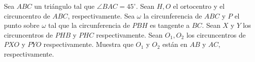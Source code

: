 Sea $ABC$ un triángulo tal que $\angle BAC = 45^{\circ}$. Sean $H,O$ el ortocentro y el circuncentro de $ABC$, respectivamente. Sea $\omega$ la circunferencia de $ABC$ y $P$ el punto sobre $\omega$ tal que la circunferencia de $PBH$ es tangente a $BC$. Sean $X$ y $Y$ los circuncentros de $PHB$ y $PHC$ respectivamente. Sean $O_1,O_2$ los circuncentros de $PXO$ y $PYO$ respectivamente. Muestra que $O_1$ y $O_2$ están en $AB$ y $AC$, respectivamente.